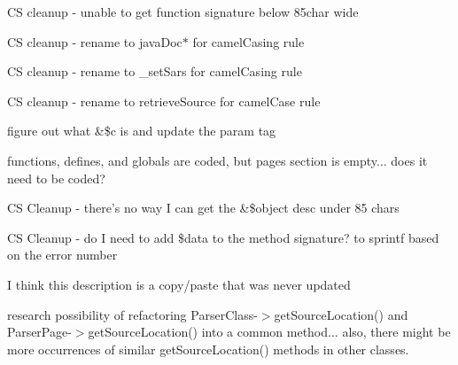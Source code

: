 \begin{DoxyRefList}
\item[\label{todo__todo000164}%
\hypertarget{todo__todo000164}{}%
\-Global \hyperlink{classphp_documentor___tutorial_highlight_parser_a3e6ac528184258b788709c5298db7719}{php\-Documentor\-\_\-\-Tutorial\-Highlight\-Parser} (\$parse\-\_\-data, \&\$converter, \$filesourcepath=false, \$linenum=false)]\-C\-S cleanup -\/ unable to get function signature below 85char wide  
\item[\label{todo__todo000149}%
\hypertarget{todo__todo000149}{}%
\-Global \hyperlink{classphp_documentor_t_parser_a8621e54d2f0eda7024fe6dafcd1ce6a8}{php\-Documentor\-T\-Parser} (\$word, \$pevent)]\-C\-S cleanup -\/ rename to java\-Doc$\ast$ for camel\-Casing rule  
\item[\label{todo__todo000153}%
\hypertarget{todo__todo000153}{}%
\-Global \hyperlink{classphp_documentor_t_word_parser_a18a78da5fa38109cc900ec25b45c43a5}{php\-Documentor\-T\-Word\-Parser} (\$type, \$word)]\-C\-S cleanup -\/ rename to \-\_\-set\-Sars for camel\-Casing rule  
\item[\label{todo__todo000152}%
\hypertarget{todo__todo000152}{}%
\-Global \hyperlink{classphp_documentor_t_word_parser_a1a5cf13738ae1d5efdb026c476ea124d}{php\-Documentor\-T\-Word\-Parser} (\$word= '')]\-C\-S cleanup -\/ rename to retrieve\-Source for camel\-Case rule  
\item[\label{todo__todo000156}%
\hypertarget{todo__todo000156}{}%
\-Global \hyperlink{class_procedural_pages_aca1dd3d0890a8494ce662272c5606992}{\-Procedural\-Pages} (\$path, \&\$c)]figure out what \&\$c is and update the param tag  
\item[\label{todo__todo000157}%
\hypertarget{todo__todo000157}{}%
\-Global \hyperlink{class_procedural_pages_a1e4d10c5fcc9f7cedad51865228f6de8}{\-Procedural\-Pages} (\&\$render)]functions, defines, and globals are coded, but pages section is empty... does it need to be coded?  
\item[\label{todo__todo000160}%
\hypertarget{todo__todo000160}{}%
\-Global \hyperlink{class_publisher_ad2ed420fdc63206cf2ae1385156661f8}{\-Publisher} (\$event, \&\$object)]\-C\-S \-Cleanup -\/ there's no way \-I can get the \&\$object desc under 85 chars  
\item[\label{todo__todo000090}%
\hypertarget{todo__todo000090}{}%
\-Global \hyperlink{class_record_warning_ae9acb2551e9b49db70d2164b5a903261}{\-Record\-Warning} (\$file, \$linenum, \$num)]\-C\-S \-Cleanup -\/ do \-I need to add \$data to the method signature? to sprintf based on the error number  
\item[\label{todo__todo000079}%
\hypertarget{todo__todo000079}{}%
\-Group \hyperlink{_errors_8inc_amgrpdc494dfd4e6bd3571eb0ed1339e4221c}{tags in a docblock} ]\-I think this description is a copy/paste that was never updated  
\item[\label{todo__todo000182}%
\hypertarget{todo__todo000182}{}%
\-Namespace \hyperlink{namespacetests}{tests} ]research possibility of refactoring \-Parser\-Class-\/$>$get\-Source\-Location() and \-Parser\-Page-\/$>$get\-Source\-Location() into a common method... also, there might be more occurrences of similar get\-Source\-Location() methods in other classes. 


\end{DoxyRefList}
